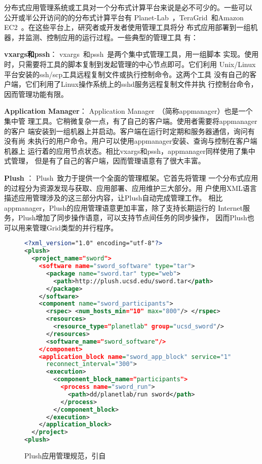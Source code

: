 分布式应用管理系统或工具对一个分布式计算平台来说是必不可少的。一些可以
公开或半公开访问的的分布式计算平台有
Planet-Lab~\cite{Bavier2004}，TeraGrid~\cite{Catlett2002}和Amazon
EC2~\cite{Garfinkel2007}。在这些平台上，研究者或开发者使用管理工具将分
布式应用部署到一组机器，并监测、控制应用的运行过程。一些典型的管理工具
有：


\textbf{vxargs和pssh}：
vxargs~\cite{vxargs}和pssh~\cite{pssh}是两个集中式管理工具，用一组脚本
实现。使用时，只需要将工具的脚本复制到发起管理的中心节点即可。它们利用
Unix/Linux平台安装的ssh/scp工具远程复制文件或执行控制命令。这两个工具
没有自己的客户端，它们利用了Linux操作系统上的sshd服务远程复制文件并执
行控制台命令，因而管理功能有限。

\textbf{Application Manager}：
Application Manager~\cite{appmanager}（简称appmanager）也是一个集中管
理工具。它稍微复杂一点，有了自己的客户端。使用者需要将appmanager的客户
端安装到一组机器上并启动。客户端在运行时定期和服务器通信，询问有没有尚
未执行的用户命令。用户可以使用appmanager安装、查询与控制在客户端机器上
运行着的应用节点状态。相比vxargs和pssh，appmanager同样使用了集中式管理，
但是有了自己的客户端，因而管理语意有了很大丰富。

\textbf{Plush} ：
Plush~\cite{plush}致力于提供一个全面的管理框架。它首先将管理
一个分布式应用的过程分为资源发现与获取、应用部署、应用维护三大部分。用
户使用XML语言描述应用管理涉及的这三部分内容，让Plush自动完成管理工作。
相比appmanager，Plush的应用管理语意更加丰富，除了支持长期运行的
Internet服务，Plush增加了同步操作语意，可以支持节点间任务的同步操作，
因而Plush也可以用来管理Grid类型的并行程序。

\begin{figure}[htb]
\centering
\begin{lstlisting}[language=XML,basicstyle=\small]
<?xml_version="1.0" encoding="utf-8"?>
<plush>
  <project_name="sword">
    <software name="sword_software" type="tar">
      <package name="sword.tar" type="web">
        <path>http://plush.ucsd.edu/sword.tar</path>
      </package>
    </software>
    <component name="sword_participants">
      <rspec> <num_hosts_min="10" max="800"/> </rspec>
      <resources>
        <resource_type="planetlab" group="ucsd_sword"/>
      </resources>
      <software_name="sword_software"/>
    </component>
    <application_block name="sword_app_block" service="1"
      reconnect_interval="300">
      <execution>
        <component_block_name="participants">
          <process name="sword_run">
            <path>dd/planetlab/run sword</path>
          </process>
        </component_block>
      </execution>
    </application_block>
  </project>
<plush>
\end{lstlisting}
\caption{Plush应用管理规范，引自~\cite{plush}}
\label{fig:plush_spec}
\end{figure}

